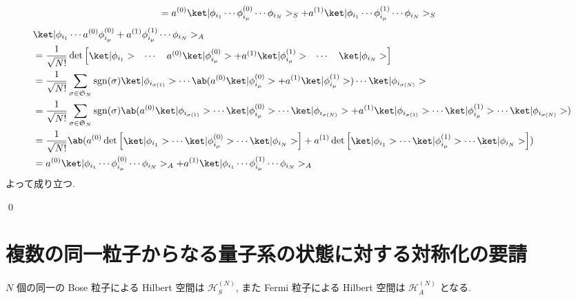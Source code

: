 \documentclass[uplatex,dvipdfmx,a4paper,11pt]{jlreq}
\makeatletter
\DeclareMathOperator{\sgn}{sgn}
\DeclareMathOperator{\Det}{det}
\newcommand{\HH}{\mathcal{H}}
\renewcommand{\SS}{\mathfrak{S}}
\numberwithin{equation}{section}
\theoremstyle{definition}
\renewenvironment{proof}[1][\proofname]{\par
  \normalfont
  \topsep6\p@\@plus6\p@ \trivlist
  \item[\hskip\labelsep{\bfseries #1}\@addpunct{\bfseries}]\ignorespaces\quad\par
}{
  \qed\endtrivlist\@endpefalse
}
\renewcommand\proofname{証明}
\makeatother
\begin{document}
\begin{proof}
\begin{align}
     & = a^{(0)}\ket|\phi_{i_1}\cdots\phi_{i_\mu}^{(0)}\cdots\phi_{i_N}>_S + a^{(1)}\ket|\phi_{i_1}\cdots\phi_{i_\mu}^{(1)}\cdots\phi_{i_N}>_S
  \end{align}
  \begin{align}
     & \ket|\phi_{i_1}\cdots a^{(0)}\phi_{i_\mu}^{(0)} + a^{(1)}\phi_{i_\mu}^{(1)}\cdots\phi_{i_N}>_A                                                                                                                                                               \\
     & = \frac{1}{\sqrt{N!}}\Det\begin{bmatrix}\ket|\phi_{i_1}> & \cdots & a^{(0)}\ket|\phi_{i_\mu}^{(0)}> + a^{(1)}\ket|\phi_{i_\mu}^{(1)}> & \cdots & \ket|\phi_{i_N}>\end{bmatrix}                                                                               \\
     & = \frac{1}{\sqrt{N!}}\sum_{\sigma\in\SS_N}\sgn(\sigma)\ket|\phi_{i_{\sigma(1)}}>\cdots\ab(a^{(0)}\ket|\phi_{i_\mu}^{(0)}> + a^{(1)}\ket|\phi_{i_\mu}^{(1)}>)\cdots\ket|\phi_{i_{\sigma(N)}}>                                                                 \\
     & = \frac{1}{\sqrt{N!}}\sum_{\sigma\in\SS_N}\sgn(\sigma)\ab(a^{(0)}\ket|\phi_{i_{\sigma(1)}}>\cdots\ket|\phi_{i_\mu}^{(0)}>\cdots\ket|\phi_{i_{\sigma(N)}}> + a^{(1)}\ket|\phi_{i_{\sigma(1)}}>\cdots\ket|\phi_{i_\mu}^{(1)}>\cdots\ket|\phi_{i_{\sigma(N)}}>) \\
     & = \frac{1}{\sqrt{N!}}\ab(a^{(0)}\Det\begin{bmatrix}\ket|\phi_{i_1}>\cdots\ket|\phi_{i_\mu}^{(0)}>\cdots\ket|\phi_{i_N}>\end{bmatrix} + a^{(1)}\Det\begin{bmatrix}\ket|\phi_{i_1}>\cdots\ket|\phi_{i_\mu}^{(1)}>\cdots\ket|\phi_{i_N}>\end{bmatrix})          \\
     & = a^{(0)}\ket|\phi_{i_1}\cdots\phi_{i_\mu}^{(0)}\cdots\phi_{i_N}>_A + a^{(1)}\ket|\phi_{i_1}\cdots\phi_{i_\mu}^{(1)}\cdots\phi_{i_N}>_A
  \end{align}
  よって成り立つ.
\end{proof}

\section{複数の同一粒子からなる量子系の状態に対する対称化の要請}
\begin{definition}
  $N$ 個の同一の Bose 粒子による Hilbert 空間は $\HH_S^{(N)}$, また Fermi 粒子による Hilbert 空間は $\HH_A^{(N)}$ となる.
\end{definition}
\end{document}
